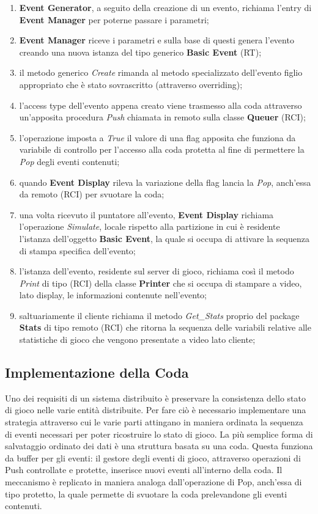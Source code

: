 \documentclass[aps,letterpaper,10pt]{article}
\begin{document}
\begin{enumerate}
\item \textbf{Event Generator}, a seguito della creazione di un evento, richiama l'entry di \textbf{Event Manager} per
poterne passare i parametri;
\item \textbf{Event Manager} riceve i parametri e sulla base di questi genera l'evento creando una nuova istanza del
tipo generico \textbf{Basic Event} (RT);
\item il metodo generico \emph{Create} rimanda al metodo specializzato dell'evento figlio appropriato che \`e stato
sovrascritto (attraverso overriding);
\item l'access type dell'evento appena creato viene trasmesso alla coda attraverso un'apposita procedura \emph{Push}
chiamata in remoto sulla classe \textbf{Queuer} (RCI);
\item l'operazione imposta a \emph{True} il valore di una flag apposita che funziona da variabile di controllo per
l'accesso alla coda protetta al fine di permettere la \emph{Pop} degli eventi contenuti;
\item quando \textbf{Event Display} rileva la variazione della flag lancia la \emph{Pop}, anch'essa da remoto (RCI) per
svuotare la coda;
\item una volta ricevuto il puntatore all'evento, \textbf{Event Display} richiama l'operazione \emph{Simulate}, locale
rispetto alla partizione in cui \`e residente l'istanza dell'oggetto \textbf{Basic Event}, la quale si occupa di
attivare la sequenza di stampa specifica dell'evento;
\item l'istanza dell'evento, residente sul server di gioco, richiama cos\`i il metodo \emph{Print} di tipo (RCI) della
classe \textbf{Printer} che si occupa di stampare a video, lato display, le informazioni contenute nell'evento;
\item saltuariamente il cliente richiama il metodo \emph{Get\_Stats} proprio del package \textbf{Stats} di tipo remoto
(RCI) che ritorna la sequenza delle variabili relative alle statistiche di gioco che vengono presentate a video lato
cliente;
\end{enumerate}

\subsection{Implementazione della Coda}

Uno dei requisiti di un sistema distribuito \`e preservare la consistenza dello stato di gioco nelle varie entit\`a
distribuite. Per fare ci\`o \`e necessario implementare una strategia attraverso cui le varie parti attingano in maniera
ordinata la sequenza di eventi necessari per poter ricostruire lo stato di gioco. La pi\`u semplice forma di salvataggio
ordinato dei dati \`e una struttura basata su una coda. Questa funziona da buffer per gli eventi: il gestore degli
eventi di gioco, attraverso operazioni di Push controllate e protette, inserisce nuovi eventi all'interno della coda. Il
meccanismo \`e replicato in maniera analoga dall'operazione di Pop, anch'essa di tipo protetto, la quale permette di
svuotare la coda prelevandone gli eventi contenuti. \vspace{3mm}
\end{document}
